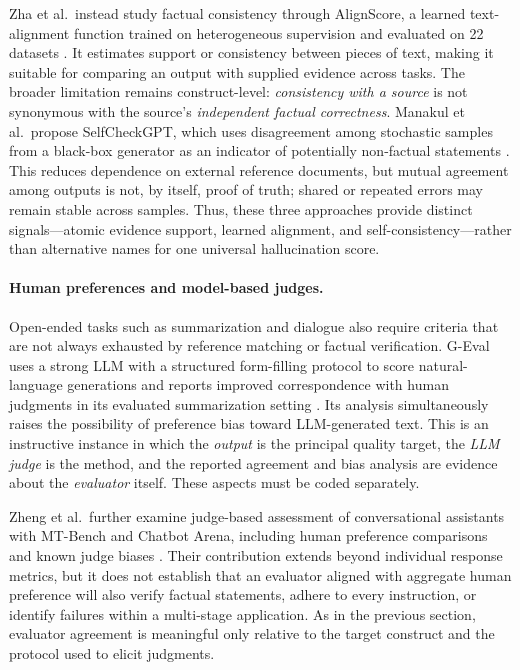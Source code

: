 Zha et al.\ instead study factual consistency through AlignScore, a learned text-alignment function trained on heterogeneous supervision and evaluated on 22 datasets \cite{zha2023alignscore}. It estimates support or consistency between pieces of text, making it suitable for comparing an output with supplied evidence across tasks. The broader limitation remains construct-level: \emph{consistency with a source} is not synonymous with the source's \emph{independent factual correctness}. Manakul et al.\ propose SelfCheckGPT, which uses disagreement among stochastic samples from a black-box generator as an indicator of potentially non-factual statements \cite{manakul2023selfcheckgpt}. This reduces dependence on external reference documents, but mutual agreement among outputs is not, by itself, proof of truth; shared or repeated errors may remain stable across samples. Thus, these three approaches provide distinct signals---atomic evidence support, learned alignment, and self-consistency---rather than alternative names for one universal hallucination score.

\paragraph{Human preferences and model-based judges.}
Open-ended tasks such as summarization and dialogue also require criteria that are not always exhausted by reference matching or factual verification. G-Eval uses a strong LLM with a structured form-filling protocol to score natural-language generations and reports improved correspondence with human judgments in its evaluated summarization setting \cite{liu2023geval}. Its analysis simultaneously raises the possibility of preference bias toward LLM-generated text. This is an instructive instance in which the \emph{output} is the principal quality target, the \emph{LLM judge} is the method, and the reported agreement and bias analysis are evidence about the \emph{evaluator} itself. These aspects must be coded separately.

Zheng et al.\ further examine judge-based assessment of conversational assistants with MT-Bench and Chatbot Arena, including human preference comparisons and known judge biases \cite{zheng2023mtbench}. Their contribution extends beyond individual response metrics, but it does not establish that an evaluator aligned with aggregate human preference will also verify factual statements, adhere to every instruction, or identify failures within a multi-stage application. As in the previous section, evaluator agreement is meaningful only relative to the target construct and the protocol used to elicit judgments.


